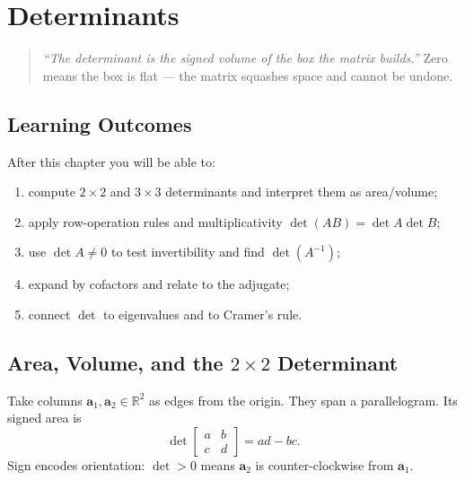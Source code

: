 \chapter{Determinants}
\label{ch:determinants}

\begin{quote}
\emph{``The determinant is the signed volume of the box the matrix builds.''} Zero means the box is flat --- the matrix squashes space and cannot be undone.
\end{quote}

\noindent{}
\vspace{0.4em}

\section*{Learning Outcomes}
After this chapter you will be able to:
\begin{enumerate}[label=(L\arabic*)]
    \item compute $2\times2$ and $3\times3$ determinants and interpret them as area/volume;
    \item apply row-operation rules and multiplicativity $\det(AB)=\det A\det B$;
    \item use $\det A\neq0$ to test invertibility and find $\det(A^{-1})$;
    \item expand by cofactors and relate to the adjugate;
    \item connect $\det$ to eigenvalues and to Cramer's rule.
\end{enumerate}

\section{Area, Volume, and the \texorpdfstring{$2\times2$}{2x2} Determinant}
\label{sec:det2x2}
Take columns $\mathbf{a}_1,\mathbf{a}_2\in\mathbb{R}^2$ as edges from the origin. They span a parallelogram. Its signed area is
\[
  \det\begin{bmatrix}a&b\\c&d\end{bmatrix}=ad-bc.
\]
Sign encodes orientation: $\det>0$ means $\mathbf{a}_2$ is counter-clockwise from $\mathbf{a}_1$.

